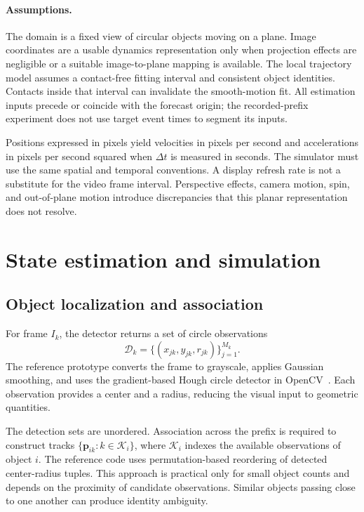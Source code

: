 \documentclass{article}
\newcommand{\pos}{\mathbf{p}}
\begin{document}
\paragraph{Assumptions.}
The domain is a fixed view of circular objects moving on a plane. Image coordinates are a usable dynamics representation only when projection effects are negligible or a suitable image-to-plane mapping is available. The local trajectory model assumes a contact-free fitting interval and consistent object identities. Contacts inside that interval can invalidate the smooth-motion fit. All estimation inputs precede or coincide with the forecast origin; the recorded-prefix experiment does not use target event times to segment its inputs.

Positions expressed in pixels yield velocities in pixels per second and accelerations in pixels per second squared when $\Delta t$ is measured in seconds. The simulator must use the same spatial and temporal conventions. A display refresh rate is not a substitute for the video frame interval. Perspective effects, camera motion, spin, and out-of-plane motion introduce discrepancies that this planar representation does not resolve.

\section{State estimation and simulation}

\subsection{Object localization and association}

For frame $I_k$, the detector returns a set of circle observations
\begin{equation}
  \mathcal D_k=\{(x_{jk},y_{jk},r_{jk})\}_{j=1}^{M_k}.
\end{equation}
The reference prototype converts the frame to grayscale, applies Gaussian smoothing, and uses the gradient-based Hough circle detector in OpenCV~\citep{opencv}. Each observation provides a center and a radius, reducing the visual input to geometric quantities.

The detection sets are unordered. Association across the prefix is required to construct tracks $\{\pos_{ik}:k\in\mathcal K_i\}$, where $\mathcal K_i$ indexes the available observations of object $i$. The reference code uses permutation-based reordering of detected center-radius tuples. This approach is practical only for small object counts and depends on the proximity of candidate observations. Similar objects passing close to one another can produce identity ambiguity.
\end{document}
